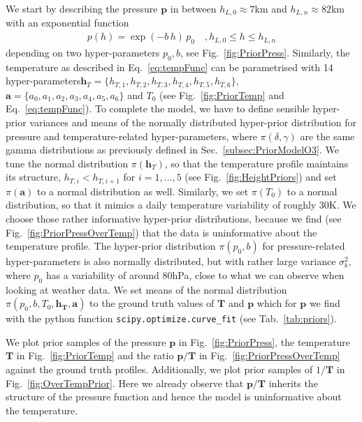 We start by describing the pressure $\bm{p}$ in between $h_{L,0} \approx 7$km and $h_{L,n} \approx 82$km with an exponential function
\begin{align}
	p(h) =
	\exp \left( -b \, h \right)   \,  p_0 \quad , \text{$h_{L,0}  \leq h \leq h_{L,n}$}
	\label{eq:pressFunc}
\end{align}
depending on two hyper-parameters $p_0,b$, see Fig.~\ref{fig:PriorPress}.
Similarly, the temperature as described in Eq.~\ref{eq:tempFunc} can be parametrised with 14 hyper-parameters\linebreak $\bm{h}_T = \{ h_{T,1}, h_{T,2},h_{T,3},h_{T,4},h_{T,5},h_{T,6} \}$, $\bm{a} = \{a_0, a_1, a_2,a_3,a_4,a_5,a_6 \} $ and $T_0$ (see Fig.~\ref{fig:PriorTemp} and Eq.~\ref{eq:tempFunc}).
To complete the model, we have to define sensible hyper-prior variances and means of the normally distributed hyper-prior distribution for pressure and temperature-related hyper-parameters, where $\pi(\delta,\gamma)$ are the same gamma distributions as previously defined in Sec.~\ref{subsec:PriorModelO3}.
We tune the normal distribution $\pi(\bm{h}_T)$, so that the temperature profile maintains its structure, $ h_{T, i} < h_{T, i+1}$ for $i = 1,\dots, 5$ (see Fig.~\ref{fig:HeightPriors}) and set $\pi(\bm{a})$ to a normal distribution as well.
Similarly, we set $\pi(T_0)$ to a normal distribution, so that it mimics a daily temperature variability of roughly 30K.
We choose those rather informative hyper-prior distributions, because we find (see Fig.~\ref{fig:PriorPressOverTemp}) that the data is uninformative about the temperature profile.
The hyper-prior distribution $\pi(p_0, b)$ for pressure-related hyper-parameters is also normally distributed, but with rather large variance $\sigma^2_b$, where $p_0$ has a variability of around 80hPa, close to what we can observe when looking at weather data.
We set means of the normal distribution $\pi(p_0,b,T_0,\bm{h_T},\bm{a})$ to the ground truth values of $\bm{T}$ and $\bm{p}$ which for $\bm{p}$ we find with the python function \texttt{scipy.optimize.curve\_fit} (see Tab.~\ref{tab:priors}).

We plot prior samples of the pressure $\bm{p}$ in Fig.~\ref{fig:PriorPress}, the temperature $\bm{T}$ in Fig.~\ref{fig:PriorTemp} and the ratio $\bm{p}/\bm{T}$ in Fig.~\ref{fig:PriorPressOverTemp} against the ground truth profiles.
Additionally, we plot prior samples of $1/\bm{T}$ in Fig.~\ref{fig:OverTempPrior}.
Here we already observe that $\bm{p}/\bm{T}$ inherits the structure of the pressure function and hence the model is uninformative about the temperature.
\clearpage

